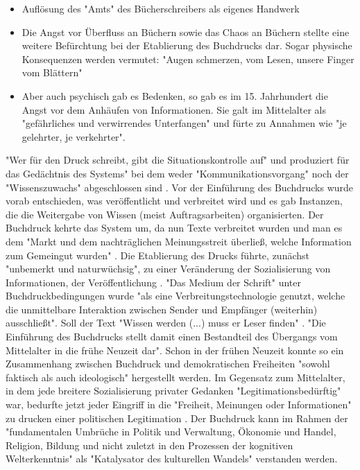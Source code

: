 \begin{itemize}
\item Auflösung des "Amts" des Bücherschreibers als eigenes Handwerk
\item Die Angst vor Überfluss an Büchern sowie das Chaos an Büchern stellte eine weitere Befürchtung bei der Etablierung des Buchdrucks dar. Sogar physische Konsequenzen werden vermutet: "Augen schmerzen, vom Lesen, unsere Finger vom Blättern" \cite{giesecke_1991_buchdruck}
\item Aber auch psychisch gab es Bedenken, so gab es im 15. Jahrhundert die Angst vor dem Anhäufen von Informationen. Sie galt im Mittelalter als "gefährliches und verwirrendes Unterfangen" und fürte zu Annahmen wie "je gelehrter, je verkehrter". \cite{giesecke_1991_buchdruck}
\end{itemize}

"Wer für den Druck schreibt, gibt die Situationskontrolle auf" und produziert für das Gedächtnis des Systems" bei dem weder "Kommunikationsvorgang" noch der "Wissenszuwachs" abgeschlossen sind \cite{Luhmann1998}. Vor der Einführung des Buchdrucks wurde vorab entschieden, was veröffentlicht und verbreitet wird und es gab Instanzen, die die Weitergabe von Wissen (meist Auftragsarbeiten) organisierten. Der Buchdruck kehrte das System um, da nun Texte verbreitet wurden und man es dem "Markt und dem nachträglichen Meinungsstreit überließ, welche Information zum Gemeingut wurden" \cite{giesecke_1991_buchdruck}. Die Etablierung des Drucks führte, zunächst "unbemerkt und naturwüchsig", zu einer Veränderung der Sozialisierung von Informationen, der Veröffentlichung \cite{giesecke_1991_buchdruck}. "Das Medium der Schrift" unter Buchdruckbedingungen wurde "als eine Verbreitungstechnologie genutzt, welche die unmittelbare Interaktion zwischen Sender und Empfänger (weiterhin) ausschließt". Soll der Text "Wissen werden (...) muss er Leser finden" \cite{Luhmann1998}. "Die Einführung des Buchdrucks stellt damit einen Bestandteil des Übergangs vom Mittelalter in die frühe Neuzeit dar"\cite{lange2008medienwettbewerb}. Schon in der frühen Neuzeit konnte so ein Zusammenhang zwischen Buchdruck und demokratischen Freiheiten "sowohl faktisch als auch ideologisch" \cite{suchen} hergestellt werden. Im Gegensatz zum Mittelalter, in dem jede breitere Sozialisierung privater Gedanken "Legitimationsbedürftig" war, bedurfte jetzt jeder Eingriff in die "Freiheit, Meinungen oder Informationen" zu drucken einer politischen Legitimation \cite{giesecke_1991_buchdruck}. Der Buchdruck kann im Rahmen der "fundamentalen Umbrüche in Politik und Verwaltung, Ökonomie und Handel, Religion, Bildung und nicht zuletzt in den Prozessen der kognitiven Welterkenntnis" \cite{pscheida_2010_wikipedia} als "Katalysator des kulturellen Wandels"\cite{giesecke_1991_buchdruck} verstanden werden.

